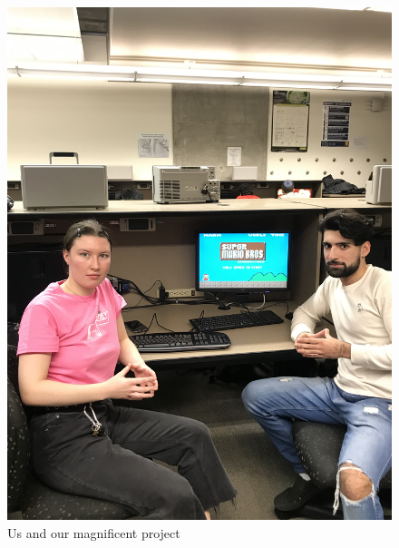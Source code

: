 \documentclass[12pt]{article}
\begin{document}
\begin{figure}[h!]
\centering
\includegraphics[width=17cm, angle=270]{IMG_1482.jpg}
\caption{Us and our magnificent project}
\end{figure}









\end{document}
